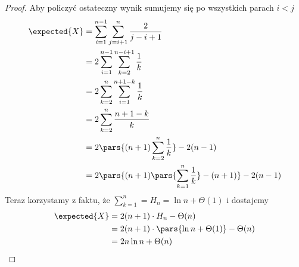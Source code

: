 \begin{proof}
Aby policzyć ostateczny wynik sumujemy się po wszystkich parach \( i < j \)
\begin{align*}
    \expected{X} 
        &= \sum_{i=1}^{n-1} \sum_{j=i+1}^{n} \frac{2}{j - i + 1} \\
        &= 2\sum_{i=1}^{n-1} \sum_{k=2}^{n-i+1} \frac{1}{k} \\
        &= 2\sum_{k=2}^n \sum_{i=1}^{n+1-k} \frac{1}{k} \\
        &= 2\sum_{k=2}^n \frac{n+1-k}{k} \\
        &= 2\pars{(n+1)\sum_{k=2}^n \frac{1}{k}} - 2(n-1) \\
        &= 2\pars{(n+1)\pars{\sum_{k=1}^n \frac{1}{k}} - (n+1)} - 2(n-1)
\end{align*}
Teraz korzystamy z faktu, że \( \sum_{k=1}^n = H_n = \ln n + \Theta(1) \) i dostajemy
\begin{align*}
    \expected{X}
        &= 2(n+1)\cdot H_n - \Theta(n) \\
        &= 2(n+1)\cdot\pars{\ln n + \Theta(1)} - \Theta(n) \\
        &= 2n \ln n + \Theta(n)
\end{align*}
\end{proof}